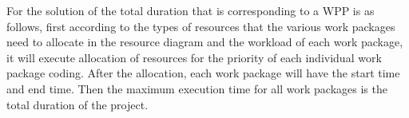 For the solution of the total duration that is corresponding to a WPP is as 
follows, first according to the types of resources that the various work 
packages need to allocate in the resource diagram and the workload of each 
work package, it will execute allocation of resources for the priority of 
each individual work package coding. After the allocation, each work package 
will have the start time and end time. Then the maximum execution time for 
all work packages is the total duration of the project.

